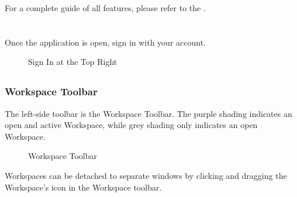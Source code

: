 \documentclass[letterpaper,10pt,english]{sphinxmanual}
\begin{document}
For a complete guide of all features, please refer to the {\hyperref[\detokenize{docs/userguide/index-user_guide:user-guide}]{}}.


\chapter{}
\label{\detokenize{docs/index:user-guide-getting-started}}

\section{}
\label{\detokenize{docs/userguide/index-user_guide:signing-in}}\label{\detokenize{docs/userguide/index-user_guide:user-guide}}\label{\detokenize{docs/userguide/index-user_guide::doc}}
Once the application is open, sign in with your account.

\begin{figure}[H]
\centering
\capstart

\noindent{}
\caption{Sign In at the Top Right}\label{\detokenize{docs/userguide/index-user_guide:id14}}\end{figure}


\section{}
\label{\detokenize{docs/userguide/index-user_guide:navigating-thrux}}

\subsection{Workspace Toolbar}
\label{\detokenize{docs/userguide/index-user_guide:workspace-toolbar}}\label{\detokenize{docs/userguide/index-user_guide:id1}}
The left-side toolbar is the Workspace Toolbar.  The purple shading indicates an open and active Workspace, while grey shading only indicates an open Workspace.

\begin{figure}[H]
\centering
\capstart

\noindent{}
\caption{Workspace Toolbar}\label{\detokenize{docs/userguide/index-user_guide:id15}}\end{figure}

Workspaces can be detached to separate windows by clicking and dragging the Workspace’s icon in the Workspace toolbar.
\end{document}

